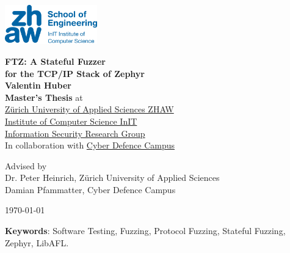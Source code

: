\documentclass[twocolumn]{article}
\newcommand{\proj}{FTZ\xspace}
\begin{document}
\begin{titlepage}
  \large
  \begin{flushright}
    \includegraphics[width=0.3\textwidth]{assets/zhaw-init-logo.png}
  \end{flushright}
  \begin{center}
    {\Huge\bfseries \proj : A Stateful Fuzzer\\[10pt]for the TCP/IP Stack of Zephyr}\\
    {\Large\bfseries Valentin Huber}\\
    {\large{\bfseries Master's Thesis} at}\\[1ex]
    \href{https://www.zhaw.ch/en/engineering/institutes-centres/init/information-security}{
      Zürich University of Applied Sciences ZHAW\\
      Institute of Computer Science InIT\\
      Information Security Research Group
    }\\[2ex]
    In collaboration with \href{https://www.cydcampus.admin.ch/}{Cyber Defence Campus}\\

    Advised by\\
    Dr. Peter Heinrich, Zürich University of Applied Sciences\\
    Damian Pfammatter, Cyber Defence Campus\\


    \today

  \end{center}
\end{titlepage}

\clearpage\newpage
\onecolumn
\begin{center}
  \begin{minipage}{0.8\textwidth}
    \vspace{70px}
    \begin{abstract}
      \lipsum[1]\lipsum[2]\lipsum[3]
    \end{abstract}
  \end{minipage}
  \vspace{70px}

  \begin{minipage}{0.7\textwidth}
    \textbf{Keywords}: Software Testing, Fuzzing, Protocol Fuzzing, Stateful Fuzzing, Zephyr, LibAFL.
  \end{minipage}
\end{center}
\end{document}
